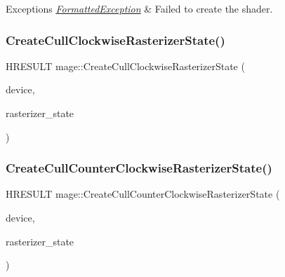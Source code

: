 \begin{DoxyExceptions}{Exceptions}
{\em \hyperlink{structmage_1_1_formatted_exception}{Formatted\+Exception}} & Failed to create the shader. \\
\hline
\end{DoxyExceptions}
\hypertarget{namespacemage_a033a0ae29692c9fc223e532b7487aed5}{}\label{namespacemage_a033a0ae29692c9fc223e532b7487aed5} 
\subsubsection{\texorpdfstring{Create\+Cull\+Clockwise\+Rasterizer\+State()}{CreateCullClockwiseRasterizerState()}}
{\footnotesize\ttfamily H\+R\+E\+S\+U\+LT mage\+::\+Create\+Cull\+Clockwise\+Rasterizer\+State (\begin{DoxyParamCaption}\item[{I\+D3\+D11\+Device2 $\ast$}]{device,  }\item[{I\+D3\+D11\+Rasterizer\+State $\ast$$\ast$}]{rasterizer\+\_\+state }\end{DoxyParamCaption})}

\hypertarget{namespacemage_a9d5863bf2519cdac7a59c39dec10b938}{}\label{namespacemage_a9d5863bf2519cdac7a59c39dec10b938} 
\subsubsection{\texorpdfstring{Create\+Cull\+Counter\+Clockwise\+Rasterizer\+State()}{CreateCullCounterClockwiseRasterizerState()}}
{\footnotesize\ttfamily H\+R\+E\+S\+U\+LT mage\+::\+Create\+Cull\+Counter\+Clockwise\+Rasterizer\+State (\begin{DoxyParamCaption}\item[{I\+D3\+D11\+Device2 $\ast$}]{device,  }\item[{I\+D3\+D11\+Rasterizer\+State $\ast$$\ast$}]{rasterizer\+\_\+state }\end{DoxyParamCaption})}

\hypertarget{namespacemage_a7583853c115c9c5cecb583fa61157c25}{}\label{namespacemage_a7583853c115c9c5cecb583fa61157c25} 
